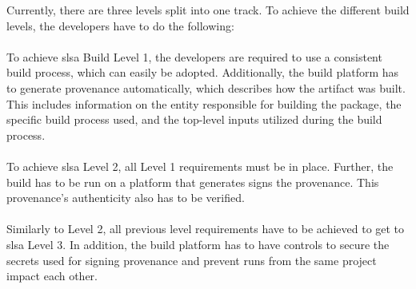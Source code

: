 Currently, there are three levels split into one track. To achieve the different build levels, the developers have to do the following:
\\~\\
To achieve \acrshort{slsa} Build Level 1, the developers are required to use a consistent build process, which can easily be adopted. Additionally, the build platform has to generate \gls{provenance} automatically, which describes how the artifact was built. This includes information on the entity responsible for building the package, the specific build process used, and the top-level inputs utilized during the build process.
\\~\\
To achieve \acrshort{slsa} Level 2, all Level 1 requirements must be in place. Further, the build has to be run on a platform that generates signs the \gls{provenance}. This \gls{provenance}'s authenticity also has to be verified.
\\~\\
Similarly to Level 2, all previous level requirements have to be achieved to get to \acrshort{slsa} Level 3. In addition, the build platform has to have controls to secure the secrets used for signing \gls{provenance} and prevent runs from the same project impact each other. 


